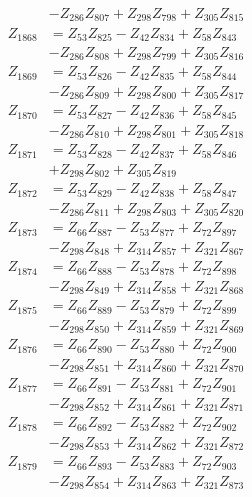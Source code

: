 \begin{multicols}{2}
\begin{align}
&- Z_{286}Z_{807} + Z_{298}Z_{798} + Z_{305}Z_{815} \nonumber \\
Z_{1868} &= Z_{53}Z_{825} - Z_{42}Z_{834} + Z_{58}Z_{843}  \nonumber \\
&- Z_{286}Z_{808} + Z_{298}Z_{799} + Z_{305}Z_{816} \nonumber \\
Z_{1869} &= Z_{53}Z_{826} - Z_{42}Z_{835} + Z_{58}Z_{844}  \nonumber \\
&- Z_{286}Z_{809} + Z_{298}Z_{800} + Z_{305}Z_{817} \nonumber \\
Z_{1870} &= Z_{53}Z_{827} - Z_{42}Z_{836} + Z_{58}Z_{845}  \nonumber \\
&- Z_{286}Z_{810} + Z_{298}Z_{801} + Z_{305}Z_{818} \nonumber \\
Z_{1871} &= Z_{53}Z_{828} - Z_{42}Z_{837} + Z_{58}Z_{846}  \nonumber \\
&+ Z_{298}Z_{802} + Z_{305}Z_{819} \nonumber \\
Z_{1872} &= Z_{53}Z_{829} - Z_{42}Z_{838} + Z_{58}Z_{847}  \nonumber \\
&- Z_{286}Z_{811} + Z_{298}Z_{803} + Z_{305}Z_{820} \nonumber \\
Z_{1873} &= Z_{66}Z_{887} - Z_{53}Z_{877} + Z_{72}Z_{897}  \nonumber \\
&- Z_{298}Z_{848} + Z_{314}Z_{857} + Z_{321}Z_{867} \nonumber \\
Z_{1874} &= Z_{66}Z_{888} - Z_{53}Z_{878} + Z_{72}Z_{898}  \nonumber \\
&- Z_{298}Z_{849} + Z_{314}Z_{858} + Z_{321}Z_{868} \nonumber \\
Z_{1875} &= Z_{66}Z_{889} - Z_{53}Z_{879} + Z_{72}Z_{899}  \nonumber \\
&- Z_{298}Z_{850} + Z_{314}Z_{859} + Z_{321}Z_{869} \nonumber \\
Z_{1876} &= Z_{66}Z_{890} - Z_{53}Z_{880} + Z_{72}Z_{900}  \nonumber \\
&- Z_{298}Z_{851} + Z_{314}Z_{860} + Z_{321}Z_{870} \nonumber \\
Z_{1877} &= Z_{66}Z_{891} - Z_{53}Z_{881} + Z_{72}Z_{901}  \nonumber \\
&- Z_{298}Z_{852} + Z_{314}Z_{861} + Z_{321}Z_{871} \nonumber \\
Z_{1878} &= Z_{66}Z_{892} - Z_{53}Z_{882} + Z_{72}Z_{902}  \nonumber \\
&- Z_{298}Z_{853} + Z_{314}Z_{862} + Z_{321}Z_{872} \nonumber \\
Z_{1879} &= Z_{66}Z_{893} - Z_{53}Z_{883} + Z_{72}Z_{903}  \nonumber \\
&- Z_{298}Z_{854} + Z_{314}Z_{863} + Z_{321}Z_{873} \nonumber \\

\end{align}
\end{multicols}

